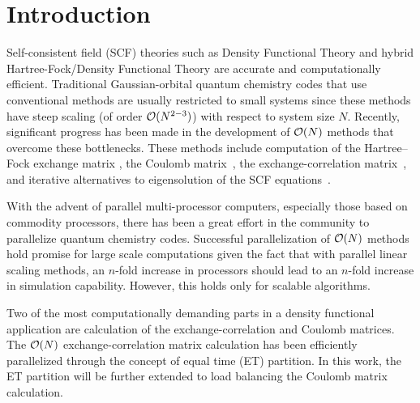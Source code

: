 \commentoutA{\documentclass[prl,aps,twocolumn,twocolumngrid,superbib]{revtex4}}
\begin{document}

\section{Introduction}
\label{sec:intro}
Self-consistent field (SCF) theories such as Density Functional Theory
and hybrid Hartree-Fock/Density Functional Theory are accurate and
computationally efficient. Traditional Gaussian-orbital quantum
chemistry codes that use conventional methods\cite{ASzabo89} are
usually restricted to small systems since these methods have steep
scaling (of order ${\cal O}(N^{2-3})$) with respect to system size
$N$.  Recently, significant progress has been made in the development
of ${\cal O}(N)$ methods that overcome these bottlenecks.  These
methods include computation of the Hartree--Fock exchange matrix
\cite{ESchwegler96,ESchwegler97,ESchwegler98A,ESchwegler99,ESchwegler00,CTymczak04b},
the Coulomb
matrix~\cite{CWhite94B,CWhite96A,MChallacombe96,MChallacombe96B,MStrain96,JPerezjorda97,MChallacombe97,CTymczak04a},
the exchange-correlation
matrix~\cite{CTymczak04a,Jorda95,RStratmann96,CGuerra98,MChallacombe00A},
and iterative alternatives to eigensolution of the SCF
equations~\cite{XLi93,MDaw93,SQiu94,EHernandez96,ADaniels97,APalser98,MChallacombe99,ANiklasson02A,ANiklasson03}.

With the advent of parallel multi-processor computers, especially
those based on commodity processors, there has been a great effort in
the community to parallelize quantum chemistry
codes\cite{Harrison_94v45,Guerra_95,Stephan_98v108,Sosa_98v19,Furlani_00v128,Sosa_00v26,Yoshihiro_01v346,Baker_02v23,JBaker04}.
Successful parallelization of ${\cal O}(N)$ methods hold promise for
large scale computations given the fact that with parallel linear
scaling methods, an $n$-fold increase in processors should lead to an
$n$-fold increase in simulation capability. However, this holds only
for scalable algorithms.

Two of the most computationally demanding parts in a density
functional application are calculation of the exchange-correlation and
Coulomb matrices. The ${\cal O}(N)$ exchange-correlation matrix
calculation has been efficiently parallelized through the concept of
equal time (ET) partition\cite{CGan03}.  In this work, the ET
partition will be further extended to load balancing the Coulomb
matrix calculation.
\end{document}
